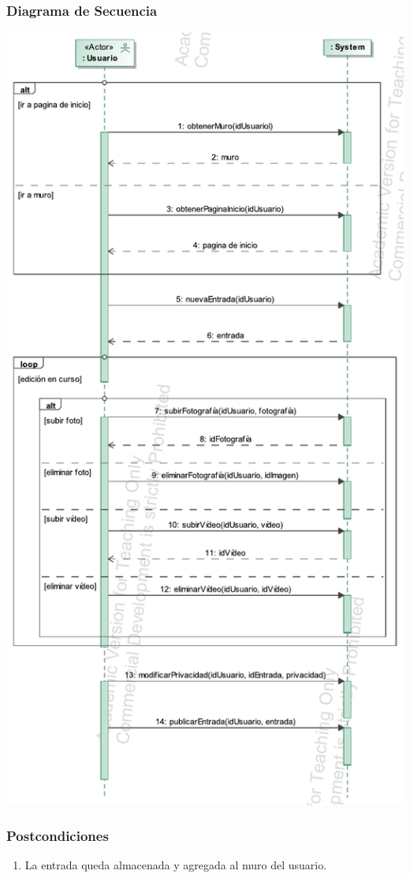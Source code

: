 \documentclass[12pt, a4paper, titlepage]{article}
\begin{document}
\subsubsection{Diagrama de Secuencia}
\begin{center}
	\includegraphics[scale=0.85]{Imagenes/Crear_entrada}
\end{center}	


\subsubsection{Postcondiciones}
\begin{enumerate}
	\item La entrada queda almacenada y agregada al muro del usuario.
\end{enumerate}
\end{document}

